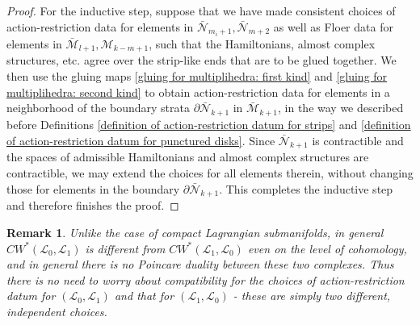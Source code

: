 \documentclass{amsart}
\newtheorem{remark}[theorem]{Remark}
\numberwithin{equation}{section}
\numberwithin{figure}{section}
\begin{document}
\begin{proof}
	For the inductive step, suppose that we have made consistent choices of action-restriction data for elements in $\bar{\mathcal{N}}_{m_{i}+1}, \bar{\mathcal{N}}_{m+2}$ as well as Floer data for elements in $\bar{\mathcal{M}}_{l+1}, \mathcal{M}_{k-m+1}$, such that the Hamiltonians, almost complex structures, etc. agree over the strip-like ends that are to be glued together. We then use the gluing maps \eqref{gluing for multiplihedra: first kind} and \eqref{gluing for multiplihedra: second kind} to obtain action-restriction data for elements in a neighborhood of the boundary strata $\partial \bar{\mathcal{N}}_{k+1}$ in $\bar{\mathcal{M}}_{k+1}$, in the way we described before Definitions \ref{definition of action-restriction datum for strips} and \ref{definition of action-restriction datum for punctured disks}. Since $\bar{\mathcal{N}}_{k+1}$ is contractible and the spaces of admissible Hamiltonians and almost complex structures are contractible, we may extend the choices for all elements therein, without changing those for elements in the boundary $\partial \bar{\mathcal{N}}_{k+1}$. This completes the inductive step and therefore finishes the proof. \par
\end{proof}

\begin{remark}
	Unlike the case of compact Lagrangian submanifolds, in general $CW^{*}(\mathcal{L}_{0}, \mathcal{L}_{1})$ is different from $CW^{*}(\mathcal{L}_{1}, \mathcal{L}_{0})$ even on the level of cohomology, and in general there is no Poincare duality between these two complexes. Thus there is no need to worry about compatibility for the choices of action-restriction datum for $(\mathcal{L}_{0}, \mathcal{L}_{1})$ and that for $(\mathcal{L}_{1}, \mathcal{L}_{0})$ - these are simply two different, independent choices.
\end{remark}
\end{document}

